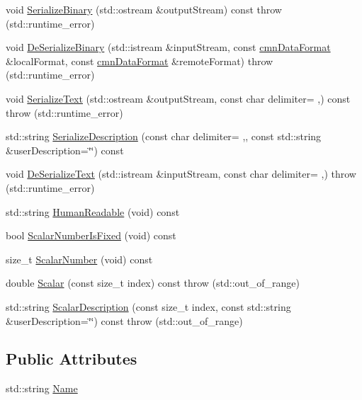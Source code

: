 \begin{DoxyCompactItemize}
\item 
void \hyperlink{classmts_event_void_description_a11a77a67506f67206ce0b47cbde2fcc3}{Serialize\+Binary} (std\+::ostream \&output\+Stream) const   throw (std\+::runtime\+\_\+error)
\item 
void \hyperlink{classmts_event_void_description_a2c859441a0af6bf0aa0ba6bbe1d7c87a}{De\+Serialize\+Binary} (std\+::istream \&input\+Stream, const \hyperlink{classcmn_data_format}{cmn\+Data\+Format} \&local\+Format, const \hyperlink{classcmn_data_format}{cmn\+Data\+Format} \&remote\+Format)  throw (std\+::runtime\+\_\+error)
\item 
void \hyperlink{classmts_event_void_description_a591922a4faf39f487b88f6b29a3c1fc7}{Serialize\+Text} (std\+::ostream \&output\+Stream, const char delimiter= \textquotesingle{},\textquotesingle{}) const   throw (std\+::runtime\+\_\+error)
\item 
std\+::string \hyperlink{classmts_event_void_description_a6f677ff672e7082fc3e7d37361abab95}{Serialize\+Description} (const char delimiter= \textquotesingle{},\textquotesingle{}, const std\+::string \&user\+Description=\char`\"{}\char`\"{}) const 
\item 
void \hyperlink{classmts_event_void_description_a5fbe1024ae9a679d17ab3eb567a66ec2}{De\+Serialize\+Text} (std\+::istream \&input\+Stream, const char delimiter= \textquotesingle{},\textquotesingle{})  throw (std\+::runtime\+\_\+error)
\item 
std\+::string \hyperlink{classmts_event_void_description_a346e83ffdc9347855bb3728844c127c7}{Human\+Readable} (void) const 
\item 
bool \hyperlink{classmts_event_void_description_ade9dd6a1b11316e28048ee9caceb89c0}{Scalar\+Number\+Is\+Fixed} (void) const 
\item 
size\+\_\+t \hyperlink{classmts_event_void_description_a88e0e5ecbf8692f9daa0b610fad4491b}{Scalar\+Number} (void) const 
\item 
double \hyperlink{classmts_event_void_description_a12117fc7d86985a158e3fc79989d91ee}{Scalar} (const size\+\_\+t index) const   throw (std\+::out\+\_\+of\+\_\+range)
\item 
std\+::string \hyperlink{classmts_event_void_description_abf0d7eac9b56cf9815f89bbf1179b135}{Scalar\+Description} (const size\+\_\+t index, const std\+::string \&user\+Description=\char`\"{}\char`\"{}) const   throw (std\+::out\+\_\+of\+\_\+range)
\end{DoxyCompactItemize}
\subsection*{Public Attributes}
\begin{DoxyCompactItemize}
\item 
std\+::string \hyperlink{classmts_event_void_description_a9738223fff7b80a3152e1acd0bc1a343}{Name}
\end{DoxyCompactItemize}


